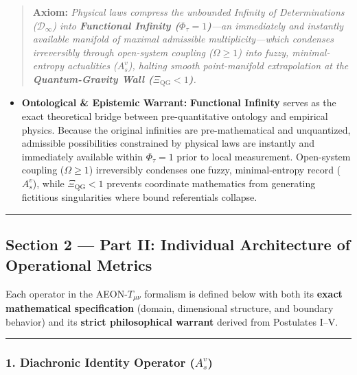 \documentclass[
]{article}
\providecommand{\tightlist}{%
  \setlength{\itemsep}{0pt}\setlength{\parskip}{0pt}}
\begin{document}
\begin{quote}
\textbf{Axiom:} \emph{Physical laws compress the unbounded Infinity of
Determinations (\(\mathcal{D}_\infty\)) into \textbf{Functional Infinity
(\(\Phi_\tau = 1\))}---an immediately and instantly available manifold
of maximal admissible multiplicity---which condenses irreversibly
through open-system coupling (\(\Omega \ge 1\)) into fuzzy,
minimal-entropy actualities (\(A_s^v\)), halting smooth point-manifold
extrapolation at the \textbf{Quantum-Gravity Wall
(\(\Xi_{\mathrm{QG}} < 1\))}.}
\end{quote}

\begin{itemize}
\tightlist
\item
  \textbf{Ontological \& Epistemic Warrant:} \textbf{Functional
  Infinity} serves as the exact theoretical bridge between
  pre-quantitative ontology and empirical physics. Because the original
  infinities are pre-mathematical and unquantized, admissible
  possibilities constrained by physical laws are instantly and
  immediately available within \(\Phi_\tau = 1\) prior to local
  measurement. Open-system coupling (\(\Omega \ge 1\)) irreversibly
  condenses one fuzzy, minimal-entropy record (\(A_s^v\)), while
  \(\Xi_{\mathrm{QG}} < 1\) prevents coordinate mathematics from
  generating fictitious singularities where bound referentials collapse.
\end{itemize}

\begin{center}\rule{0.5\linewidth}{0.5pt}\end{center}

\subsection{Section 2 --- Part II: Individual Architecture of
Operational
Metrics}\label{section-2-part-ii-individual-architecture-of-operational-metrics}

Each operator in the AEON-\(T_{\mu\nu}\) formalism is defined below with
both its \textbf{exact mathematical specification} (domain, dimensional
structure, and boundary behavior) and its \textbf{strict philosophical
warrant} derived from Postulates I--V.

\begin{center}\rule{0.5\linewidth}{0.5pt}\end{center}

\subsubsection{\texorpdfstring{1. Diachronic Identity Operator
(\(A_s^v\))}{1. Diachronic Identity Operator (A\_s\^{}v)}}\label{diachronic-identity-operator-a_sv}
\end{document}
